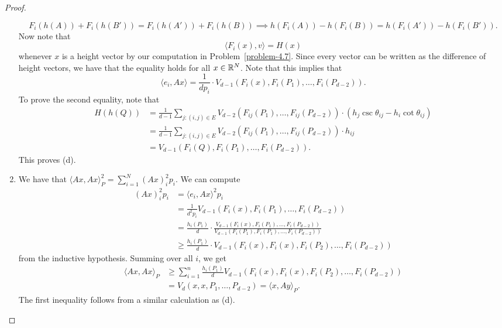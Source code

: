 \documentclass[12pt]{article}
\begin{document}
\begin{proof}
\begin{enumerate}[label = (\alph*)]
		\[
			F_i(h(A)) + F_i(h(B')) = F_i(h(A')) + F_i(h(B)) \implies h(F_i(A)) - h(F_i(B)) = h(F_i(A')) - h(F_i(B')).
		\]
		Now note that 
		\[
			\langle F_i(x), v \rangle = H(x)
		\]
		whenever $x$ is a height vector by our computation in Problem~\ref{problem-4.7}. Since every vector can be written as the difference of height vectors, we have that the equality holds for all $x \in \mathbb{R}^N$. Note that this implies that 
		\[
			\langle e_i, Ax \rangle = \frac{1}{dp_i} \cdot V_{d-1}(F_i(x), F_i(P_1), \ldots, F_i(P_{d-2})).
		\] 
		To prove the second equality, note that 
		\begin{align*}
			H(h(Q)) & = \frac{1}{d-1} \sum_{j : (i, j) \in E} V_{d-2} (F_{ij}(P_1), \ldots, F_{ij}(P_{d-2})) \cdot (h_j \csc \theta_{ij} - h_i \cot \theta_{ij}) \\
			& = \frac{1}{d-1} \sum_{j : (i, j) \in E} V_{d-2} (F_{ij}(P_1), \ldots, F_{ij}(P_{d-2})) \cdot h_{ij} \\
			& = V_{d-1} (F_i(Q), F_i(P_1), \ldots, F_i(P_{d-2})).
		\end{align*}
		This proves (d). 
		\item We have that $\langle Ax, Ax \rangle_P^2 = \sum_{i = 1}^N (Ax)_i^2 p_i$. We can compute
		\begin{align*}
			(Ax)_i^2 p_i & = \langle e_i, Ax \rangle^2 p_i \\
			& = \frac{1}{d^2 p_i} V_{d-1}(F_i(x), F_i(P_1), \ldots, F_i(P_{d-2})) \\
			& = \frac{h_i(P_1)}{d} \cdot \frac{V_{d-1}(F_i(x), F_i(P_1), \ldots, F_i(P_{d-2}))}{V_{d-1}(F_i(P_1), F_i(P_1), \ldots, F_i(P_{d-2}))} \\
			& \geq \frac{h_i(P_1)}{d} \cdot V_{d-1}(F_i(x), F_i(x), F_i(P_2), \ldots, F_i(P_{d-2}))
		\end{align*}
		from the inductive hypothesis. Summing over all $i$, we get 
		\begin{align*}
			\langle Ax, Ax \rangle_P & \geq \sum_{i = 1}^n \frac{h_i(P_1)}{d} V_{d-1}(F_i(x), F_i(x), F_i(P_2), \ldots, F_i(P_{d-2})) \\
			& = V_d(x, x, P_1, \ldots, P_{d-2}) = \langle x, Ay \rangle_P.
		\end{align*}
		The first inequality follows from a similar calculation as (d). 


\end{enumerate}
\end{proof}
\end{document}
